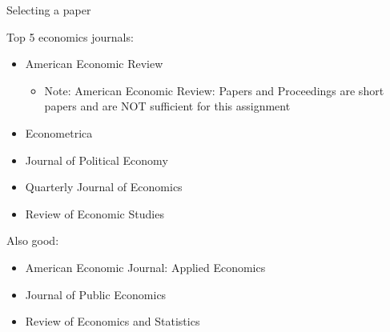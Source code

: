 \documentclass[compress, 8pt]{beamer}
\begin{document}
\begin{frame}{Selecting a paper}

Top 5 economics journals:
\begin{itemize}
    \item American Economic Review
    \begin{itemize}
        \item Note: American Economic Review: Papers and Proceedings are short papers and are NOT sufficient for this assignment
    \end{itemize}
    \item Econometrica
    \item Journal of Political Economy
    \item Quarterly Journal of Economics
    \item Review of Economic Studies
\end{itemize}
Also good:
\begin{itemize}
    \item American Economic Journal: Applied Economics
    \item Journal of Public Economics
    \item Review of Economics and Statistics
\end{itemize}



\end{frame}


\end{document}
